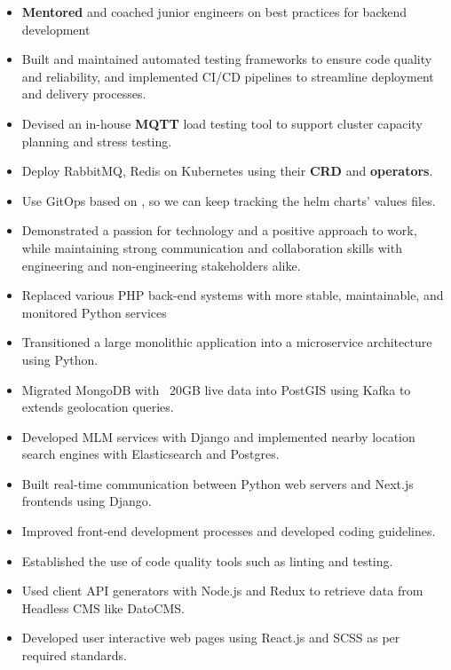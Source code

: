 \vspace{1cm}

\vspace{0.5cm}
\begin{itemize}
  \item \textbf{Mentored} and coached junior engineers on best practices for backend development
  \item Built and maintained automated testing frameworks to ensure code quality and reliability,
    and implemented CI/CD pipelines to streamline deployment and delivery processes.
  \item Devised an in-house \textbf{MQTT} load testing tool to support cluster capacity planning and stress testing.
  \item Deploy RabbitMQ, Redis on Kubernetes using their \textbf{CRD} and \textbf{operators}.
  \item Use GitOps based on , so we can keep tracking the helm charts' values files.
  \item Demonstrated a passion for technology and a positive approach to work,
    while maintaining strong communication and collaboration skills with engineering
    and non-engineering stakeholders alike.
\end{itemize}

\vspace{1cm}

\vspace{0.5cm}
\begin{itemize}
  \item Replaced various PHP back-end systems with more stable, maintainable, and monitored Python services
  \item Transitioned a large monolithic application into a microservice architecture using Python.
  \item Migrated MongoDB with ~20GB live data into PostGIS using Kafka to extends geolocation queries.
  \item Developed MLM services with Django and implemented nearby location search engines with
    Elasticsearch and Postgres.
  \item Built real-time communication between Python web servers and Next.js frontends using Django.
  \item Improved front-end development processes and developed coding guidelines.
  \item Established the use of code quality tools such as linting and testing.
  \item Used client API generators with Node.js and Redux to retrieve data from Headless CMS like DatoCMS.
  \item Developed user interactive web pages using React.js and SCSS as per required standards.
\end{itemize}

